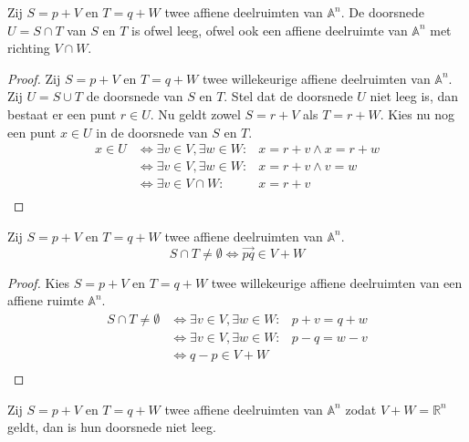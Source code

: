 \documentclass[main.tex]{subfiles}
\begin{document}
\begin{st}
\label{st:affiene-doorsnede-ruimte}
  Zij $S = p + V$ en $T = q + W$ twee affiene deelruimten van $\mathbb{A}^{n}$.
  De doorsnede $U = S \cap T$ van $S$ en $T$ is ofwel leeg, ofwel ook een affiene deelruimte van $\mathbb{A}^{n}$ met richting $V \cap W$.

  \begin{proof}
    Zij $S = p + V$ en $T = q + W$ twee willekeurige affiene deelruimten van $\mathbb{A}^{n}$.
    Zij $U = S \cup T$ de doorsnede van $S$ en $T$.
    Stel dat de doorsnede $U$ niet leeg is, dan bestaat er een punt $r \in U$. Nu geldt zowel $S = r + V$ als $T = r + W$. Kies nu nog een punt $x \in U$ in de doorsnede van $S$ en $T$.
    \[
    \begin{array}{cll}
      x \in U &\Leftrightarrow \exists v \in V, \exists w \in W:& x = r + v \wedge x = r + w\\
              &\Leftrightarrow \exists v \in V, \exists w \in W:& x = r + v \wedge v = w\\
              &\Leftrightarrow \exists v \in V \cap W:& x = r + v\\
    \end{array}
    \]
  \end{proof}
\end{st}


\begin{st}
  Zij $S = p + V$ en $T = q + W$ twee affiene deelruimten van $\mathbb{A}^{n}$.
  \[ S \cap T \neq \emptyset \Leftrightarrow \overrightarrow{pq} \in V + W \]

  \begin{proof}
    Kies $S = p + V$ en $T = q + W$ twee willekeurige affiene deelruimten van een affiene ruimte $\mathbb{A}^{n}$.
    \[
    \begin{array}{cll}
      S \cap T \neq \emptyset &\Leftrightarrow \exists v \in V, \exists w \in W:& p + v = q + w\\
                              &\Leftrightarrow \exists v \in V, \exists w \in W:& p - q = w - v\\
                              &\Leftrightarrow q - p \in V + W\\
    \end{array}
    \]
  \end{proof}
\end{st}

\begin{gev}
  \label{gev:deelruimten-niet-leeg-dimensie-n}
  Zij $S = p + V$ en $T = q + W$ twee affiene deelruimten van $\mathbb{A}^{n}$ zodat $V + W = \mathbb{R}^{n}$ geldt, dan is hun doorsnede niet leeg.
\end{gev}
\end{document}
